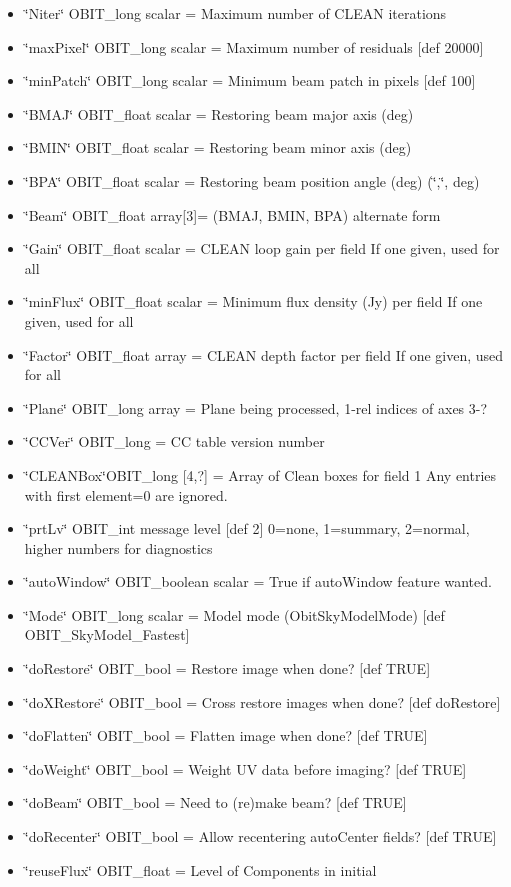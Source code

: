 \begin{itemize}
\item \char`\"{}Niter\char`\"{} OBIT\_\-long scalar = Maximum number of CLEAN iterations \item \char`\"{}max\-Pixel\char`\"{} OBIT\_\-long scalar = Maximum number of residuals [def 20000] \item \char`\"{}min\-Patch\char`\"{} OBIT\_\-long scalar = Minimum beam patch in pixels [def 100] \item \char`\"{}BMAJ\char`\"{} OBIT\_\-float scalar = Restoring beam major axis (deg) \item \char`\"{}BMIN\char`\"{} OBIT\_\-float scalar = Restoring beam minor axis (deg) \item \char`\"{}BPA\char`\"{} OBIT\_\-float scalar = Restoring beam position angle (deg) (\char`\"{},\char`\"{}, deg) \item \char`\"{}Beam\char`\"{} OBIT\_\-float array[3]= (BMAJ, BMIN, BPA) alternate form \item \char`\"{}Gain\char`\"{} OBIT\_\-float scalar = CLEAN loop gain per field If one given, used for all \item \char`\"{}min\-Flux\char`\"{} OBIT\_\-float scalar = Minimum flux density (Jy) per field If one given, used for all \item \char`\"{}Factor\char`\"{} OBIT\_\-float array = CLEAN depth factor per field If one given, used for all \item \char`\"{}Plane\char`\"{} OBIT\_\-long array = Plane being processed, 1-rel indices of axes 3-? \item \char`\"{}CCVer\char`\"{} OBIT\_\-long = CC table version number \item \char`\"{}CLEANBox\char`\"{}OBIT\_\-long [4,?] = Array of Clean boxes for field 1 Any entries with first element=0 are ignored. \item \char`\"{}prt\-Lv\char`\"{} OBIT\_\-int message level [def 2] 0=none, 1=summary, 2=normal, higher numbers for diagnostics \item \char`\"{}auto\-Window\char`\"{} OBIT\_\-boolean scalar = True if auto\-Window feature wanted. \item \char`\"{}Mode\char`\"{} OBIT\_\-long scalar = Model mode (Obit\-Sky\-Model\-Mode) [def OBIT\_\-Sky\-Model\_\-Fastest] \item \char`\"{}do\-Restore\char`\"{} OBIT\_\-bool = Restore image when done? [def TRUE] \item \char`\"{}do\-XRestore\char`\"{} OBIT\_\-bool = Cross restore images when done? [def do\-Restore] \item \char`\"{}do\-Flatten\char`\"{} OBIT\_\-bool = Flatten image when done? [def TRUE] \item \char`\"{}do\-Weight\char`\"{} OBIT\_\-bool = Weight UV data before imaging? [def TRUE] \item \char`\"{}do\-Beam\char`\"{} OBIT\_\-bool = Need to (re)make beam? [def TRUE] \item \char`\"{}do\-Recenter\char`\"{} OBIT\_\-bool = Allow recentering auto\-Center fields? [def TRUE] \item \char`\"{}reuse\-Flux\char`\"{} OBIT\_\-float = Level of Components in initial 
\end{itemize}
